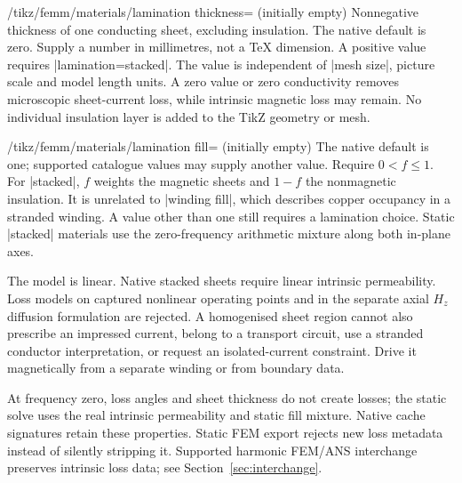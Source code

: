 \begin{key}{/tikz/femm/materials/lamination thickness= (initially empty)}
Nonnegative thickness of one conducting sheet, excluding insulation. The native
default is zero. Supply a number in millimetres, not a TeX dimension.
A positive value requires |lamination=stacked|. The value is
independent of |mesh size|, picture scale and model length units. A zero value
or zero conductivity removes microscopic sheet-current loss, while intrinsic
magnetic loss may remain. No individual insulation layer is added to the TikZ
geometry or mesh.
\end{key}
\begin{key}{/tikz/femm/materials/lamination fill= (initially empty)}
The native default is one; supported catalogue values may supply another value.
Require $0<f\leq1$. For |stacked|, $f$ weights the magnetic sheets and $1-f$
the nonmagnetic insulation. It is unrelated to |winding fill|, which describes
copper occupancy in a stranded winding. A value other than one still requires
a lamination choice. Static |stacked| materials use the zero-frequency arithmetic
mixture along both in-plane axes.
\end{key}

The model is linear. Native stacked sheets require linear intrinsic permeability.
Loss models on captured nonlinear operating points and in the separate axial
$H_z$ diffusion formulation are rejected. A homogenised sheet region cannot
also prescribe an impressed current, belong to a transport circuit, use a
stranded conductor interpretation, or request an isolated-current constraint.
Drive it magnetically from a separate winding or from boundary data.

At frequency zero, loss angles and sheet thickness do not create losses; the
static solve uses the real intrinsic permeability and static fill mixture.
Native cache signatures retain these properties. Static FEM export rejects
new loss metadata instead of silently stripping it. Supported harmonic FEM/ANS interchange preserves intrinsic loss data;
see Section~\ref{sec:interchange}.

